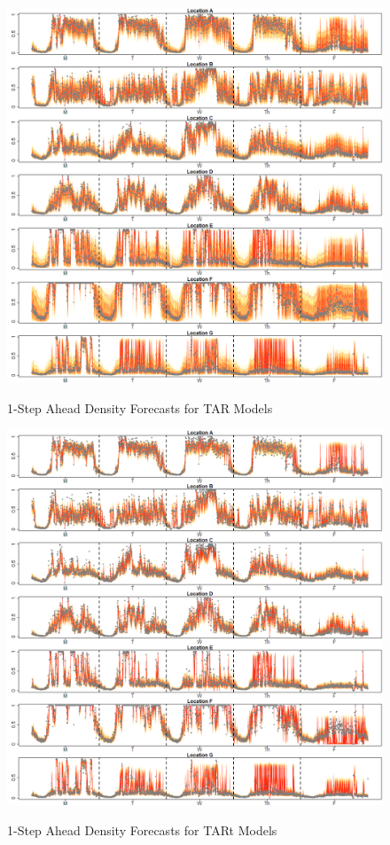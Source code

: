 \begin{figure}[htbp]
\caption{1-Step Ahead Density Forecasts for TAR Models}
\includegraphics[width=\textwidth]{DENS1Plots}
\label{fig:DENS1Plots}
\end{figure}

\begin{figure}[htbp]
\caption{1-Step Ahead Density Forecasts for TARt Models}
\includegraphics[width=\textwidth]{DENS1tPlots}
\label{fig:DENS1tPlots}
\end{figure}

